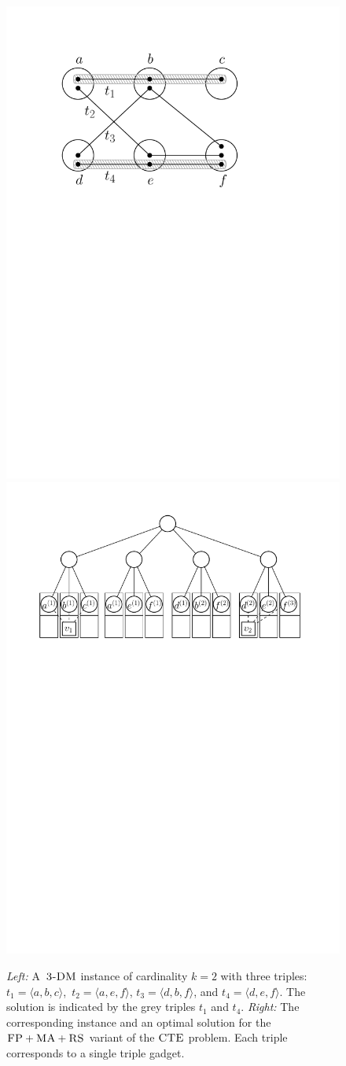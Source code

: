 \begin{figure}[t]
  \centering
\includegraphics[width = 0.31\columnwidth]{figs/static-mapping/tdp-example}
\hspace{1cm}
\centering
\includegraphics[width = 0.55\columnwidth]{figs/static-mapping/cte-ma}
\hfill
\caption{\textit{Left:} A~$\textsc{3-DM}$ instance of cardinality $k=2$ with three triples:
$t_1 = \langle a, b, c \rangle$,~$t_2 = \langle a, e, f \rangle$, $t_3 = \langle d, b, f \rangle$, and $t_4 = \langle d, e, f \rangle$. The solution is
indicated by the grey triples $t_1$ and $t_4$. \textit{Right:} The corresponding instance and an optimal solution for the~$\textsc{FP} + \textsc{MA}
+ \textsc{RS}$ variant of the $\textsc{CTE}$ problem. Each triple corresponds to a single triple gadget.}
\hfill
\label{fig:fprsma}
\end{figure}

